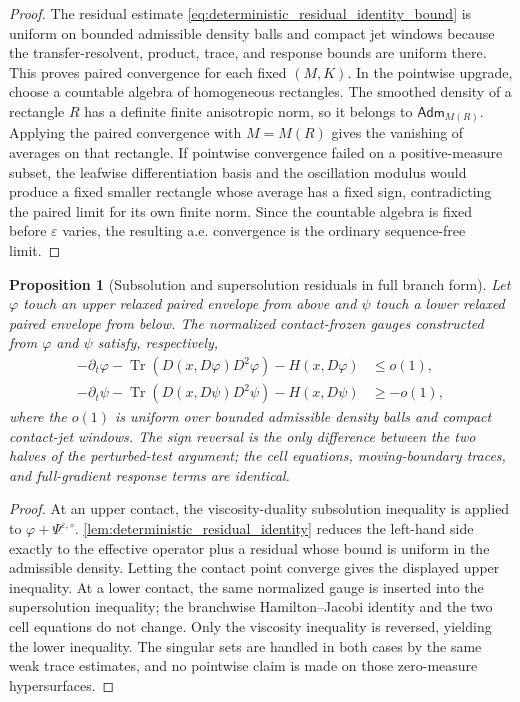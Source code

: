 \documentclass[12pt, letterpaper]{amsart}
\providecommand{\Tr}{\operatorname{Tr}}
\newcommand{\Adm}{\mathsf{Adm}}
\theoremstyle{plain}
\newtheorem{proposition}[theorem]{Proposition}
\theoremstyle{definition}
\theoremstyle{remark}
\begin{document}
\begin{proof}
The residual estimate \eqref{eq:deterministic_residual_identity_bound} is
uniform on bounded admissible density balls and compact jet windows because the
transfer-resolvent, product, trace, and response bounds are uniform there.  This
proves paired convergence for each fixed \((M,K)\).  In the pointwise upgrade,
choose a countable algebra of homogeneous rectangles.  The smoothed density of
a rectangle \(R\) has a definite finite anisotropic norm, so it belongs to
\(\Adm_{M(R)}\).  Applying the paired convergence with \(M=M(R)\) gives the
vanishing of averages on that rectangle.  If pointwise convergence failed on a
positive-measure subset, the leafwise differentiation basis and the oscillation
modulus would produce a fixed smaller rectangle whose average has a fixed sign,
contradicting the paired limit for its own finite norm.  Since the countable
algebra is fixed before \(\varepsilon\) varies, the resulting a.e. convergence
is the ordinary sequence-free limit.
\end{proof}

\begin{proposition}[Subsolution and supersolution residuals in full branch form]
\label{prop:subsuper_residuals_full_branch}
Let \(\varphi\) touch an upper relaxed paired envelope from above and \(\psi\)
touch a lower relaxed paired envelope from below.  The normalized
contact-frozen gauges constructed from \(\varphi\) and \(\psi\) satisfy,
respectively,
\begin{align}
    -\partial_t\varphi
    -\Tr(D(x,D\varphi)D^2\varphi)-H(x,D\varphi)&\le o(1),\\
    -\partial_t\psi
    -\Tr(D(x,D\psi)D^2\psi)-H(x,D\psi)&\ge -o(1),
\end{align}
where the \(o(1)\) is uniform over bounded admissible density balls and compact
contact-jet windows.  The sign reversal is the only difference between the two
halves of the perturbed-test argument; the cell equations, moving-boundary
traces, and full-gradient response terms are identical.
\end{proposition}

\begin{proof}
At an upper contact, the viscosity-duality subsolution inequality is applied to
\(\varphi+\Psi^{\varepsilon,\circ}\).  \cref{lem:deterministic_residual_identity}
reduces the left-hand side exactly to the effective operator plus a residual
whose bound is uniform in the admissible density.  Letting the contact point
converge gives the displayed upper inequality.  At a lower contact, the same
normalized gauge is inserted into the supersolution inequality; the branchwise
Hamilton--Jacobi identity and the two cell equations do not change.  Only the
viscosity inequality is reversed, yielding the lower inequality.  The singular
sets are handled in both cases by the same weak trace estimates, and no pointwise
claim is made on those zero-measure hypersurfaces.
\end{proof}
\end{document}
